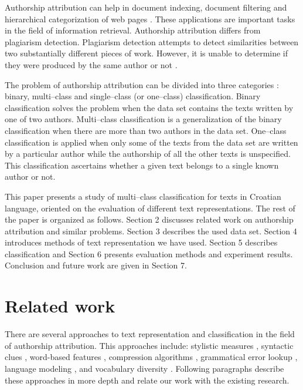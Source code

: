 \documentclass[11pt,english]{article}
\begin{document}
\begin{multicols}{2}
Authorship attribution can help in document indexing, document filtering and
hierarchical categorization of web pages \citep{luyckx2005shallow}. These
applications are important tasks in the field of information retrieval. 
Authorship attribution differs from plagiarism detection. Plagiarism detection
attempts to detect similarities between two substantially different pieces of
work. However, it is unable to determine if they were produced by the same author or not
\citep{de2001mining}.

The problem of authorship attribution can be divided into three categories \citep{zhao2005effective}: binary,
multi--class and single--class (or one--class) classification. Binary classification 
solves the problem when the data set contains the texts written by one of two authors. Multi--class 
classification is a generalization of the binary classification when there are 
more than two authors in the data set. One--class classification
is applied when only some of the texts from the data set are written by a particular
author while the authorship of all the other texts is unspecified. This
classification ascertains whether a given text belongs to a single known author or not.

This paper presents a study of multi--class classification for texts in Croatian
language, oriented on the evaluation of different text representations. The rest of
the paper is organized as follows. Section 2 discusses related work on authorship
attribution and similar problems. Section 3 describes the used data set. Section
4 introduces methods of text representation we have used. Section 5 describes
classification and Section 6 presents evaluation methods and experiment results.
Conclusion and future work are given in Section 7.

\section{Related work}
There are several approaches to text representation and classification in the field 
of authorship attribution. This approaches include: stylistic measures \citep{coyotl2006authorship}, syntactic clues
\citep{stamatatos2001computer,uzuner2005comparative}, word-based features
\citep{argamon2005measuring,uzuner2005comparative}, compression algorithms
\citep{kukushkina2001using,zhao2005effective}, grammatical error lookup
\citep{koppel2003exploiting}, language modeling
\citep{peng2003language,coyotl2006authorship}, and vocabulary diversity
\citep{stamatatos2001computer}. Following paragraphs describe these approaches in
more depth and relate our work with the existing research.


\end{multicols}
\end{document}
